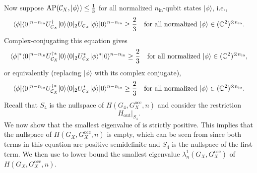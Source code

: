 \documentclass[../thesis-main/thesis-main]{subfiles}
\begin{document}
Now suppose $\operatorname{AP}(\mathcal{C}_{X},|\phi\rangle)\leq\frac{1}{3}$ for all normalized $n_{{\text{in}}}$-qubit states $|\phi\rangle$, i.e.,
\begin{equation}
\langle\phi|\langle0|^{n-n_{{\text{in}}}}U_{\mathcal{C}_{X}}^{\dagger}|0\rangle\langle0|_{2}U_{\mathcal{C}_{X}}|\phi\rangle|0\rangle^{n-n_{{\text{in}}}}\geq\frac{2}{3}\quad\text{for all normalized }|\phi\rangle\in(\mathbb{C}^{2})^{\otimes n_{{\text{in}}}}.\label{eq:soundness_a0}
\end{equation}
Complex-conjugating this equation gives
\begin{align}
\langle\phi|^{*}\langle0|^{n-n_{{\text{in}}}}U_{\mathcal{C}_{X}}^{\dagger*}|0\rangle\langle0|_{2}U_{\mathcal{C}_{X}}^{*}|\phi\rangle^{*}|0\rangle^{n-n_{{\text{in}}}}\geq\frac{2}{3}\quad\text{for all normalized }|\phi\rangle\in(\mathbb{C}^{2})^{\otimes n_{{\text{in}}}},
\end{align}
or equivalently (replacing $|\phi\rangle$ with its complex conjugate),
\begin{equation}
\langle\phi|\langle0|^{n-n_{{\text{in}}}}U_{\mathcal{C}_{X}}^{\dagger*}|0\rangle\langle0|_{2}U_{\mathcal{C}_{X}}^{*}|\phi\rangle|0\rangle^{n-n_{{\text{in}}}}\geq\frac{2}{3}\quad\text{for all normalized }|\phi\rangle\in(\mathbb{C}^{2})^{\otimes n_{{\text{in}}}}.\label{eq:soundness_a1}
\end{equation}
Recall that $S_{4}$ is the nullspace of $H(G_{4},G_X^{\text{occ}},n)$ and consider the restriction 
\begin{equation}
H_{{\text{out}}}\big|_{S_{4}}.\label{eq:res_S4}
\end{equation}
We now show that the smallest eigenvalue of  is strictly positive. This implies that the nullspace of $H(G_{X},G_X^{\text{occ}},n)$ is empty, which can be seen from  since both terms in this equation are positive semidefinite and $S_4$ is the nullspace of the first term. We then use  to lower bound the smallest eigenvalue $\lambda_n^{1}(G_{X},G_X^{\text{occ}})$ of $H(G_{X},G_X^{\text{occ}},n)$.
\end{document}
